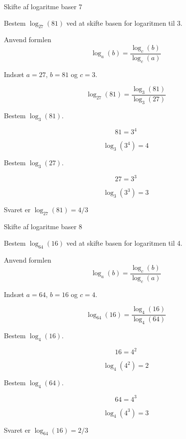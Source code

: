 \documentclass{article}
\begin{document}
\newpage
\begin{exercise}{Skifte af logaritme baser 7}
	
	Bestem $\log_{27}(81)$ ved at skifte basen for logaritmen til 3.
	
	
	\hint
	
	Anvend formlen 
	\[
	\log_a(b) = \frac{\log_c(b)}{\log_c(a)}
	\]
	
	\hint
	
	Indsæt $a=27$, $b=81$ og $c=3$.
	
	\hint
	\[
	\log_{27}(81) = \frac{\log_3(81)}{\log_3(27)}
	\]
	
	\hint
	Bestem $\log_3(81)$.
	
	\hint
	\[
	81  = 3^4	
	\]
	
	
	\hint
	\[
	\log_3(3^4) = 4
	\]
	
	\hint
	Bestem $\log_3(27)$.
	
	\hint
	\[
	27  = 3^3
	\]
	
	\hint
	\[
	\log_3(3^3) = 3
	\]
	
	\hint
	Svaret er 	$\log_{27}(81) = 4/3$
	
	
\end{exercise}

\newpage
\begin{exercise}{Skifte af logaritme baser 8}
	
	Bestem $\log_{64}(16)$ ved at skifte basen for logaritmen til 4.
	
	
	\hint
	
	Anvend formlen 
	\[
	\log_a(b) = \frac{\log_c(b)}{\log_c(a)}
	\]
	
	\hint
	
	Indsæt $a=64$, $b=16$ og $c=4$.
	
	\hint
	\[
	\log_{64}(16) = \frac{\log_4(16)}{\log_4(64)}
	\]
	
	\hint
	Bestem $\log_4(16)$.
	
	\hint
	\[
	16  = 4^2	
	\]
	
	
	\hint
	\[
	\log_4(4^2) = 2
	\]
	
	\hint
	Bestem $\log_4(64)$.
	
	\hint
	\[
	64  = 4^3
	\]
	
	\hint
	\[
	\log_4(4^3) = 3
	\]
	
	\hint
	Svaret er 	$\log_{64}(16) = 2/3$
	
	
\end{exercise}

\newpage
\end{document}
